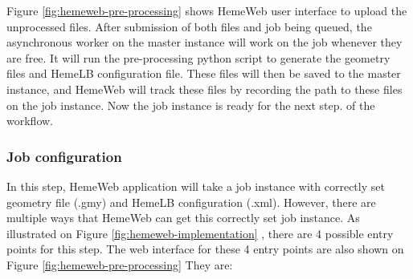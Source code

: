 \vspace{1cm}


Figure \ref{fig:hemeweb-pre-processing} shows HemeWeb user interface to upload the unprocessed files.  After submission of both files and job being queued, the asynchronous worker on the master instance will work on the job whenever they are free. It will run the pre-processing python script to generate the geometry files and HemeLB configuration file. These files will then be saved to the master instance, and HemeWeb will track these files by recording the path to these files on the job instance. Now the job instance is ready for the next step. of the workflow.

\subsubsection{Job configuration}

In this step, HemeWeb application will take a job instance with correctly set geometry file (.gmy) and HemeLB configuration (.xml). However, there are multiple ways that HemeWeb can get this correctly set job instance. As illustrated on Figure \ref{fig:hemeweb-implementation} , there are 4 possible entry points for this step. The web interface for these 4 entry points are also shown on Figure \ref{fig:hemeweb-pre-processing} They are:

